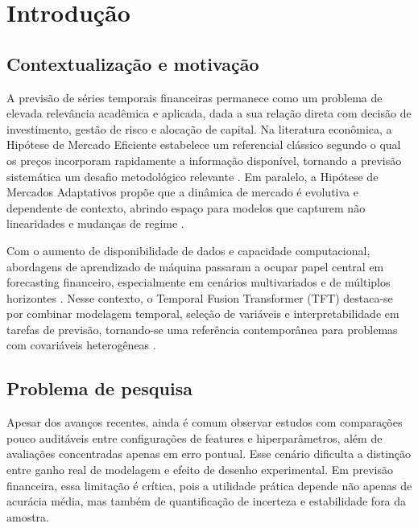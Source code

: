 \chapter{Introdução} \label{chap: Intro}


\section{Contextualização e motivação}
A previsão de séries temporais financeiras permanece como um problema de elevada relevância acadêmica e aplicada, dada a sua relação direta com decisão de investimento, gestão de risco e alocação de capital. Na literatura econômica, a Hipótese de Mercado Eficiente estabelece um referencial clássico segundo o qual os preços incorporam rapidamente a informação disponível, tornando a previsão sistemática um desafio metodológico relevante \cite{FAMA1991}. Em paralelo, a Hipótese de Mercados Adaptativos propõe que a dinâmica de mercado é evolutiva e dependente de contexto, abrindo espaço para modelos que capturem não linearidades e mudanças de regime \cite{LO2004}.

Com o aumento de disponibilidade de dados e capacidade computacional, abordagens de aprendizado de máquina passaram a ocupar papel central em forecasting financeiro, especialmente em cenários multivariados e de múltiplos horizontes \cite{LIMZOHREN2021}. Nesse contexto, o Temporal Fusion Transformer (TFT) destaca-se por combinar modelagem temporal, seleção de variáveis e interpretabilidade em tarefas de previsão, tornando-se uma referência contemporânea para problemas com covariáveis heterogêneas \cite{LIMETAL2021TFT}.

\section{Problema de pesquisa}
Apesar dos avanços recentes, ainda é comum observar estudos com comparações pouco auditáveis entre configurações de features e hiperparâmetros, além de avaliações concentradas apenas em erro pontual. Esse cenário dificulta a distinção entre ganho real de modelagem e efeito de desenho experimental. Em previsão financeira, essa limitação é crítica, pois a utilidade prática depende não apenas de acurácia média, mas também de quantificação de incerteza e estabilidade fora da amostra.

